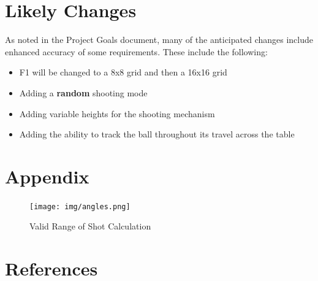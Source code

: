 \documentclass[11pt]{article}
\begin{document}
\section{Likely Changes}
As noted in the Project Goals document, many of the anticipated changes include enhanced accuracy of some requirements. These include the following:
\begin{itemize}
\item F1 will be changed to a 8x8 grid and then a 16x16 grid
\item Adding a \textbf{random} shooting mode
\item Adding variable heights for the shooting mechanism
\item Adding the ability to track the ball throughout its travel across the table
\end{itemize}
\section{Appendix}
\begin{figure}[H]
\centering
\texttt{[image: img/angles.png]}
\caption{Valid Range of Shot Calculation}
\label{fig:calc}
\end{figure}
\section{References}
\printbibliography
\end{document}
